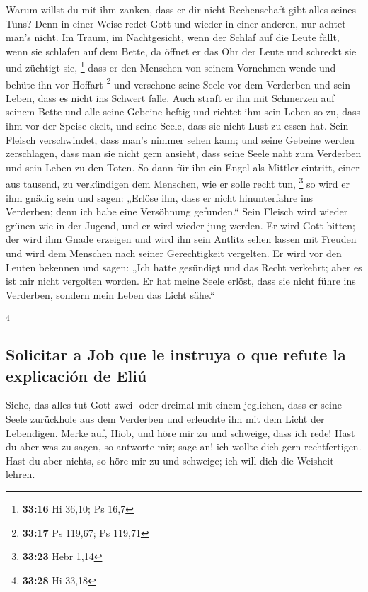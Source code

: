  Warum willst du mit ihm zanken, dass er dir nicht
Rechenschaft gibt alles seines Tuns?  Denn in einer Weise
redet Gott und wieder in einer anderen, nur achtet man's nicht.
 Im Traum, im Nachtgesicht, wenn der Schlaf auf die Leute
fällt, wenn sie schlafen auf dem Bette,  da öffnet er das
Ohr der Leute und schreckt sie und züchtigt sie, \footnote{\textbf{33:16}
  Hi 36,10; Ps 16,7}  dass er den Menschen von seinem
Vornehmen wende und behüte ihn vor Hoffart \footnote{\textbf{33:17} Ps
  119,67; Ps 119,71}  und verschone seine Seele vor dem
Verderben und sein Leben, dass es nicht ins Schwert falle.
 Auch straft er ihn mit Schmerzen auf seinem Bette und
alle seine Gebeine heftig  und richtet ihm sein Leben so
zu, dass ihm vor der Speise ekelt, und seine Seele, dass sie nicht Lust
zu essen hat.  Sein Fleisch verschwindet, dass man's
nimmer sehen kann; und seine Gebeine werden zerschlagen, dass man sie
nicht gern ansieht,  dass seine Seele naht zum Verderben
und sein Leben zu den Toten.  So dann für ihn ein Engel
als Mittler eintritt, einer aus tausend, zu verkündigen dem Menschen,
wie er solle recht tun, \footnote{\textbf{33:23} Hebr 1,14}
 so wird er ihm gnädig sein und sagen: „Erlöse ihn, dass
er nicht hinunterfahre ins Verderben; denn ich habe eine Versöhnung
gefunden.``  Sein Fleisch wird wieder grünen wie in der
Jugend, und er wird wieder jung werden.  Er wird Gott
bitten; der wird ihm Gnade erzeigen und wird ihn sein Antlitz sehen
lassen mit Freuden und wird dem Menschen nach seiner Gerechtigkeit
vergelten.  Er wird vor den Leuten bekennen und sagen:
„Ich hatte gesündigt und das Recht verkehrt; aber es ist mir nicht
vergolten worden.  Er hat meine Seele erlöst, dass sie
nicht führe ins Verderben, sondern mein Leben das Licht sähe.``

\footnote{\textbf{33:28} Hi 33,18}

\hypertarget{solicitar-a-job-que-le-instruya-o-que-refute-la-explicaciuxf3n-de-eliuxfa}{%
\subsection{Solicitar a Job que le instruya o que refute la explicación
de
Eliú}\label{solicitar-a-job-que-le-instruya-o-que-refute-la-explicaciuxf3n-de-eliuxfa}}

 Siehe, das alles tut Gott zwei- oder dreimal mit einem
jeglichen,  dass er seine Seele zurückhole aus dem
Verderben und erleuchte ihn mit dem Licht der Lebendigen.
 Merke auf, Hiob, und höre mir zu und schweige, dass ich
rede!  Hast du aber was zu sagen, so antworte mir; sage
an! ich wollte dich gern rechtfertigen.  Hast du aber
nichts, so höre mir zu und schweige; ich will dich die Weisheit lehren.

